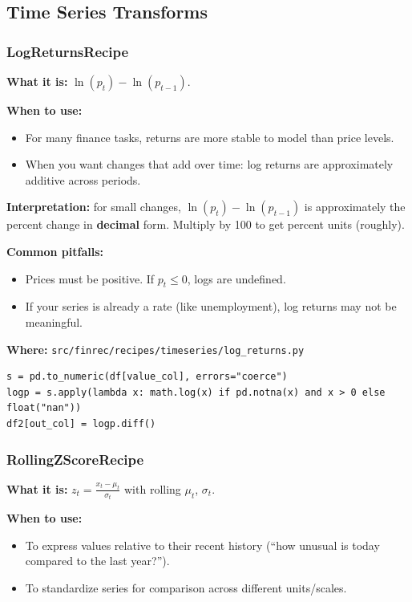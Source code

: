 \documentclass[11pt,a4paper]{article}
\begin{document}
\subsection{Time Series Transforms}

\subsubsection{LogReturnsRecipe}\label{sec:log-returns}

\textbf{What it is:} $\ln(p_t) - \ln(p_{t-1})$.

\textbf{When to use:}
\begin{itemize}[leftmargin=2em]
  \item For many finance tasks, returns are more stable to model than price levels.
  \item When you want changes that add over time: log returns are approximately additive across periods.
\end{itemize}

\textbf{Interpretation:} for small changes, \(\ln(p_t) - \ln(p_{t-1})\) is approximately the percent change in \textbf{decimal} form. Multiply by 100 to get percent units (roughly).

\textbf{Common pitfalls:}
\begin{itemize}[leftmargin=2em]
  \item Prices must be positive. If \(p_t \le 0\), logs are undefined.
  \item If your series is already a rate (like unemployment), log returns may not be meaningful.
\end{itemize}

\textbf{Where:} \texttt{src/finrec/recipes/timeseries/log\_returns.py}

\begin{lstlisting}
s = pd.to_numeric(df[value_col], errors="coerce")
logp = s.apply(lambda x: math.log(x) if pd.notna(x) and x > 0 else float("nan"))
df2[out_col] = logp.diff()
\end{lstlisting}

\subsubsection{RollingZScoreRecipe}\label{sec:rolling-zscore}

\textbf{What it is:} $z_t = \frac{x_t - \mu_t}{\sigma_t}$ with rolling $\mu_t$, $\sigma_t$.

\textbf{When to use:}
\begin{itemize}[leftmargin=2em]
  \item To express values relative to their recent history (``how unusual is today compared to the last year?'').
  \item To standardize series for comparison across different units/scales.
\end{itemize}
\end{document}
